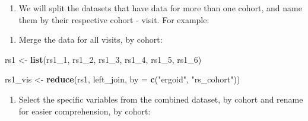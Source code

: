 \documentclass[]{book}
\newenvironment{Shaded}{\begin{snugshade}}{\end{snugshade}}
\newcommand{\CommentTok}[1]{\textcolor[rgb]{0.56,0.35,0.01}{\textit{#1}}}
\newcommand{\DataTypeTok}[1]{\textcolor[rgb]{0.13,0.29,0.53}{#1}}
\newcommand{\DecValTok}[1]{\textcolor[rgb]{0.00,0.00,0.81}{#1}}
\newcommand{\KeywordTok}[1]{\textcolor[rgb]{0.13,0.29,0.53}{\textbf{#1}}}
\newcommand{\NormalTok}[1]{#1}
\newcommand{\OperatorTok}[1]{\textcolor[rgb]{0.81,0.36,0.00}{\textbf{#1}}}
\newcommand{\StringTok}[1]{\textcolor[rgb]{0.31,0.60,0.02}{#1}}
\providecommand{\tightlist}{%
  \setlength{\itemsep}{0pt}\setlength{\parskip}{0pt}}
\begin{document}
\begin{enumerate}
\def\labelenumi{\arabic{enumi}.}
\setcounter{enumi}{1}
\tightlist
\item
  We will split the datasets that have data for more than one cohort, and name them by their respective cohort - visit. For example:
\end{enumerate}

\begin{Shaded}
\end{Shaded}

\begin{enumerate}
\def\labelenumi{\arabic{enumi}.}
\setcounter{enumi}{2}
\tightlist
\item
  Merge the data for all visits, by cohort:
\end{enumerate}

\begin{Shaded}
\begin{Highlighting}[]
\NormalTok{rs1 <-}\StringTok{ }\KeywordTok{list}\NormalTok{(rs1_}\DecValTok{1}\NormalTok{, rs1_}\DecValTok{2}\NormalTok{, rs1_}\DecValTok{3}\NormalTok{, rs1_}\DecValTok{4}\NormalTok{, rs1_}\DecValTok{5}\NormalTok{, rs1_}\DecValTok{6}\NormalTok{)}

\NormalTok{rs1_vis <-}\StringTok{ }\KeywordTok{reduce}\NormalTok{(rs1, left_join, }\DataTypeTok{by =} \KeywordTok{c}\NormalTok{(}\StringTok{"ergoid"}\NormalTok{, }\StringTok{"rs_cohort"}\NormalTok{))}
\end{Highlighting}
\end{Shaded}

\begin{enumerate}
\def\labelenumi{\arabic{enumi}.}
\setcounter{enumi}{3}
\tightlist
\item
  Select the specific variables from the combined dataset, by cohort and rename for easier comprehension, by cohort:
\end{enumerate}
\end{document}
